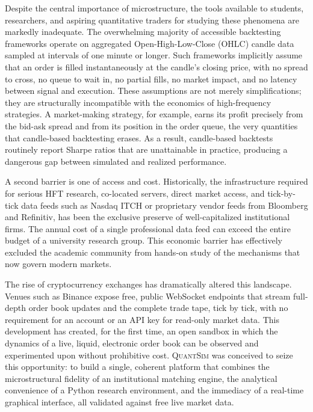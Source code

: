 \documentclass[12pt,oneside,a4paper]{report}
\newcommand{\quantsim}{\textsc{QuantSim}}
\begin{document}
Despite the central importance of microstructure, the tools available to students, researchers, and aspiring quantitative traders for studying these phenomena are markedly inadequate. The overwhelming majority of accessible backtesting frameworks operate on aggregated Open-High-Low-Close (OHLC) candle data sampled at intervals of one minute or longer. Such frameworks implicitly assume that an order is filled instantaneously at the candle's closing price, with no spread to cross, no queue to wait in, no partial fills, no market impact, and no latency between signal and execution. These assumptions are not merely simplifications; they are structurally incompatible with the economics of high-frequency strategies. A market-making strategy, for example, earns its profit precisely from the bid-ask spread and from its position in the order queue, the very quantities that candle-based backtesting erases. As a result, candle-based backtests routinely report Sharpe ratios that are unattainable in practice, producing a dangerous gap between simulated and realized performance.

A second barrier is one of access and cost. Historically, the infrastructure required for serious HFT research, co-located servers, direct market access, and tick-by-tick data feeds such as Nasdaq ITCH or proprietary vendor feeds from Bloomberg and Refinitiv, has been the exclusive preserve of well-capitalized institutional firms. The annual cost of a single professional data feed can exceed the entire budget of a university research group. This economic barrier has effectively excluded the academic community from hands-on study of the mechanisms that now govern modern markets.

The rise of cryptocurrency exchanges has dramatically altered this landscape. Venues such as Binance expose free, public WebSocket endpoints that stream full-depth order book updates and the complete trade tape, tick by tick, with no requirement for an account or an API key for read-only market data. This development has created, for the first time, an open sandbox in which the dynamics of a live, liquid, electronic order book can be observed and experimented upon without prohibitive cost. \quantsim{} was conceived to seize this opportunity: to build a single, coherent platform that combines the microstructural fidelity of an institutional matching engine, the analytical convenience of a Python research environment, and the immediacy of a real-time graphical interface, all validated against free live market data.
\end{document}

